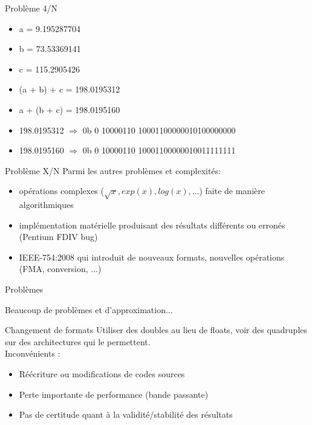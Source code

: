 \documentclass{beamer}
\begin{document}
    \begin{frame}{Problème 4/N} 
    \begin{itemize}
\item a = 9.195287704 \\
\item b = 73.53369141 \\
\item c = 115.2905426 \\
\item (a + b) + c = 198.0195312 \\
\item a + (b + c) = 198.0195160 \\
\item 198.0195312 $\Rightarrow$ 0b \textcolor{SignColor}{0} \textcolor{ExponentColor}{10000110} \textcolor{FractionColor}{10001100000010100000000}\\
\item 198.0195160 $\Rightarrow$ 0b \textcolor{SignColor}{0} \textcolor{ExponentColor}{10000110} \textcolor{FractionColor}{10001100000010011111111}
\end{itemize}
    \end{frame}
    
  \begin{frame}{Problème X/N}
  Parmi les autres problèmes et complexités: 
  \begin{itemize}
  \item opérations complexes ($\sqrt{x}, exp(x), log(x), ...$) faite de manière algorithmiques
  \item implémentation matérielle produisant des résultats différents ou erronés (Pentium FDIV bug)
  \item IEEE-754:2008 qui introduit de nouveaux formats, nouvelles opérations (FMA, conversion, ...)
  \end{itemize}
  \end{frame}
  
    \begin{frame}{Problèmes}
    \begin{center}
    Beaucoup de problèmes et d'approximation...
      \end{center}
        \end{frame}  
  
    \begin{frame}{Changement de formats}
  Utiliser des doubles au lieu de floats, voir des quadruples sur des architectures qui le permettent. \\
  Inconvénients :
  \begin{itemize}
  \item Réécriture ou modifications de codes sources
  \item Perte importante de performance (bande passante)
  \item Pas de certitude quant à la validité/stabilité des résultats
  \end{itemize} 
  \end{frame}
  
\end{document}
